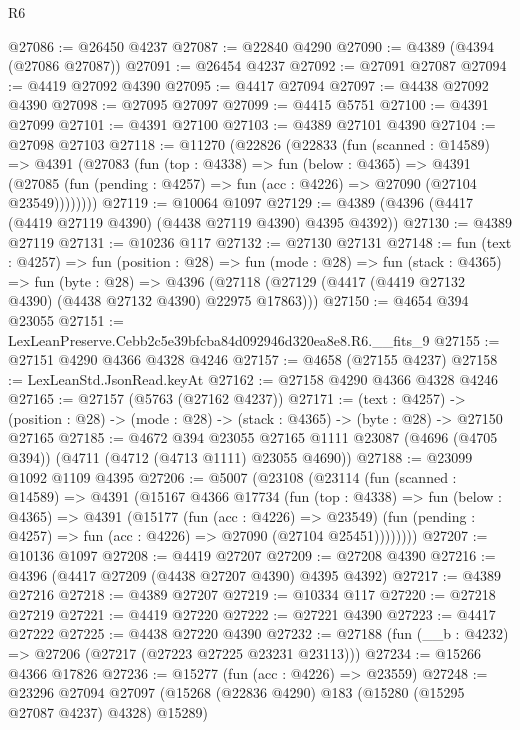 \begin{lexlean}{R6}
\begin{coremodule}
@27086 := @26450 @4237
@27087 := @22840 @4290
@27090 := @4389 (@4394 (@27086 @27087))
@27091 := @26454 @4237
@27092 := @27091 @27087
@27094 := @4419 @27092 @4390
@27095 := @4417 @27094
@27097 := @4438 @27092 @4390
@27098 := @27095 @27097
@27099 := @4415 @5751
@27100 := @4391 @27099
@27101 := @4391 @27100
@27103 := @4389 @27101 @4390
@27104 := @27098 @27103
@27118 := @11270
    (@22826
      (@22833
        (fun (scanned : @14589) =>
        @4391
          (@27083
            (fun (top : @4338) =>
            fun (below : @4365) =>
            @4391
              (@27085 (fun (pending : @4257) => fun (acc : @4226) => @27090 (@27104 @23549))))))))
@27119 := @10064 @1097
@27129 := @4389 (@4396 (@4417 (@4419 @27119 @4390) (@4438 @27119 @4390) @4395 @4392))
@27130 := @4389 @27119
@27131 := @10236 @117
@27132 := @27130 @27131
@27148 := fun (text : @4257) =>
  fun (position : @28) =>
  fun (mode : @28) =>
  fun (stack : @4365) =>
  fun (byte : @28) =>
  @4396 (@27118 (@27129 (@4417 (@4419 @27132 @4390) (@4438 @27132 @4390) @22975 @17863)))
@27150 := @4654 @394 @23055
@27151 := LexLeanPreserve.Cebb2c5e39bfcba84d092946d320ea8e8.R6.__fits_9
@27155 := @27151 @4290 @4366 @4328 @4246
@27157 := @4658 (@27155 @4237)
@27158 := LexLeanStd.JsonRead.keyAt
@27162 := @27158 @4290 @4366 @4328 @4246
@27165 := @27157 (@5763 (@27162 @4237))
@27171 := (text : @4257) ->
  (position : @28) -> (mode : @28) -> (stack : @4365) -> (byte : @28) -> @27150 @27165
@27185 := @4672
    @394
    @23055
    @27165
    @1111
    @23087
    (@4696 (@4705 @394))
    (@4711 (@4712 (@4713 @1111) @23055 @4690))
@27188 := @23099 @1092 @1109 @4395
@27206 := @5007
    (@23108
      (@23114
        (fun (scanned : @14589) =>
        @4391
          (@15167
            @4366
            @17734
            (fun (top : @4338) =>
            fun (below : @4365) =>
            @4391
              (@15177
                (fun (acc : @4226) => @23549)
                (fun (pending : @4257) => fun (acc : @4226) => @27090 (@27104 @25451))))))))
@27207 := @10136 @1097
@27208 := @4419 @27207
@27209 := @27208 @4390
@27216 := @4396 (@4417 @27209 (@4438 @27207 @4390) @4395 @4392)
@27217 := @4389 @27216
@27218 := @4389 @27207
@27219 := @10334 @117
@27220 := @27218 @27219
@27221 := @4419 @27220
@27222 := @27221 @4390
@27223 := @4417 @27222
@27225 := @4438 @27220 @4390
@27232 := @27188 (fun (__b : @4232) => @27206 (@27217 (@27223 @27225 @23231 @23113)))
@27234 := @15266 @4366 @17826
@27236 := @15277 (fun (acc : @4226) => @23559)
@27248 := @23296
    @27094
    @27097
    (@15268 (@22836 @4290) @183 (@15280 (@15295 @27087 @4237) @4328) @15289)

\end{coremodule}
\end{lexlean}
